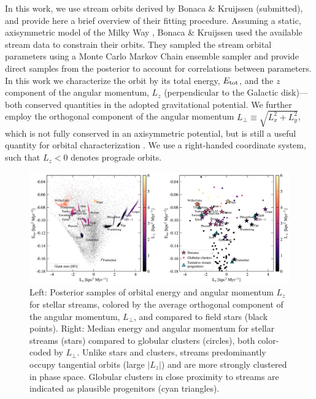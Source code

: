 \documentclass[twocolumn]{aastex63}
\begin{document}
In this work, we use stream orbits derived by Bonaca \& Kruijssen (submitted), and provide here a brief overview of their fitting procedure.
Assuming a static, axisymmetric model of the Milky Way \citep[v1.2 \texttt{MilkyWayPotential}]{gala}, Bonaca \& Kruijssen used the available stream data to constrain their orbits.
They sampled the stream orbital parameters using a Monte Carlo Markov Chain ensemble sampler and provide direct samples from the posterior to account for correlations between parameters.
In this work we characterize the orbit by its total energy, $E_{\rm tot}$, and the $z$ component of the angular momentum, $L_z$ (perpendicular to the Galactic disk)---both conserved quantities in the adopted gravitational potential.
We further employ the orthogonal component of the angular momentum $L_\perp \equiv \sqrt{L_x^2 + L_y^2}$, which is not fully conserved in an axisymmetric potential, but is still a useful quantity for orbital characterization \citep[e.g.,][]{helmi1999}.
We use a right-handed coordinate system, such that $L_z<0$ denotes prograde orbits.

\begin{figure}
\begin{center}
\includegraphics[width=\textwidth]{elz_streams.pdf}
\end{center}
\caption{
Left: Posterior samples of orbital energy and angular momentum $L_z$ for stellar streams, colored by the average orthogonal component of the angular momentum, $L_\perp$, and compared to field stars (black points).
Right: Median energy and angular momentum for stellar streams (stars) compared to globular clusters (circles), both color-coded by $L_\perp$.
Unlike stars and clusters, streams predominantly occupy tangential orbits (large $|L_z|$) and are more strongly clustered in phase space.
Globular clusters in close proximity to streams are indicated as plausible progenitors (cyan triangles).
}
\label{fig:elz}
\end{figure}
\end{document}
